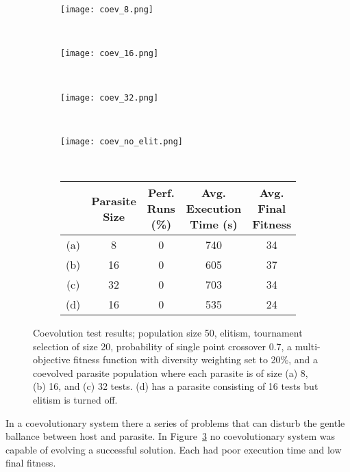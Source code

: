 \begin{figure}
	\centering
	\begin{subfigure}[ht]{0.49\textwidth}
		\texttt{[image: coev\_8.png]}
		\caption{}
		\vspace{1em}
	\end{subfigure}
	~
	\begin{subfigure}[ht]{0.49\textwidth}
		\texttt{[image: coev\_16.png]}
		\caption{}
		\label{fig:coev_16}
		\vspace{1em}
	\end{subfigure}
	~
	\begin{subfigure}[ht]{0.49\textwidth}
		\texttt{[image: coev\_32.png]}
		\caption{}
		\vspace{1em}
	\end{subfigure}
	~
	\begin{subfigure}[ht]{0.49\textwidth}
		\texttt{[image: coev\_no\_elit.png]}
		\caption{}
		\label{fig:coev_16_no_elit}
		\vspace{1em}
	\end{subfigure}
	~
	\begin{subfigure}[ht]{\textwidth}
		\centering
		\begin{tabular}{ccccc}
			\toprule
			& \bfseries{Parasite Size} &
			\bfseries{Perf. Runs (\%)} &
			\bfseries{Avg. Execution Time (s)} & \bfseries{Avg. Final Fitness}\\
			\midrule
			(a) & 8 & 0 & 740 & 34 \\
			(b) & 16 & 0 & 605 & 37 \\
			(c) & 32 & 0 & 703 & 34 \\
			(d) & 16 & 0 & 535 & 24 \\
			\bottomrule
		\end{tabular}
	\end{subfigure}

	\caption[Coevolution test results]{Coevolution test results;
	population size 50, elitism, tournament selection of size 20, probability
	of single point crossover 0.7, a multi-objective fitness function with
	diversity weighting set to 20\%, and a coevolved parasite population where
	each parasite is of size
	(a) 8, (b) 16, and (c) 32 tests. (d) has a parasite consisting of 16 tests
	but elitism is turned off.}
	\label{fig:coev}
\end{figure}

In a coevolutionary system there a series of problems that can disturb the gentle
ballance between host and parasite.
In Figure~\ref{fig:coev} no coevolutionary system was capable of evolving a successful
solution. Each had poor execution time and low final fitness.


